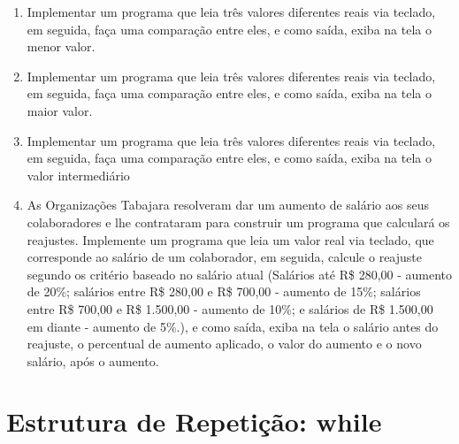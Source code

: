 \documentclass[11pt]{article}
\begin{document}
\begin{enumerate}
	\item Implementar um programa que leia três valores diferentes reais via teclado, em seguida, faça uma
	comparação entre eles, e como saída, exiba na tela o menor valor.
	
	\item  Implementar um programa que leia três valores diferentes reais via teclado, em seguida, faça uma
	comparação entre eles, e como saída, exiba na tela o maior valor.
	
	\item Implementar um programa que leia três valores diferentes reais via teclado, em seguida, faça uma
	comparação entre eles, e como saída, exiba na tela o valor intermediário
	
	\item As Organizações Tabajara resolveram dar um aumento de salário aos seus colaboradores e lhe
	contrataram para construir um programa que calculará os reajustes. Implemente um programa
	que leia um valor real via teclado, que corresponde ao salário de um colaborador, em seguida,
	calcule o reajuste segundo os critério baseado no salário atual (Salários até R\$ 280,00 - aumento
	de 20\%; salários entre R\$ 280,00 e R\$ 700,00 - aumento de 15\%; salários entre R\$ 700,00 e R\$
	1.500,00 - aumento de 10\%; e salários de R\$ 1.500,00 em diante - aumento de 5\%.), e como saída,
	exiba na tela o salário antes do reajuste, o percentual de aumento aplicado, o valor do aumento
	e o novo salário, após o aumento.
\end{enumerate}

\newpage

\section{Estrutura de Repetição: while}
\end{document}
